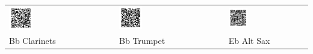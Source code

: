 \begin{tabular}{p{} p{} p{}  p{} p{}}
  \includegraphics[width=0.25\textwidth]{QR_Codes/QR_OverTheRainbow_Bb_Clar.png}
  &
  &
  \includegraphics[width=0.25\textwidth]{QR_Codes/QR_OverTheRainbow_Bb_Trumpet.png}
  &
  &
  \includegraphics[width=0.25\textwidth]{QR_Codes/QR_OverTheRainbow_Eb.png}\\                                                     
   Bb Clarinets
   &
   &
   Bb Trumpet
   &
   &
   Eb Alt Sax\\
\end{tabular}